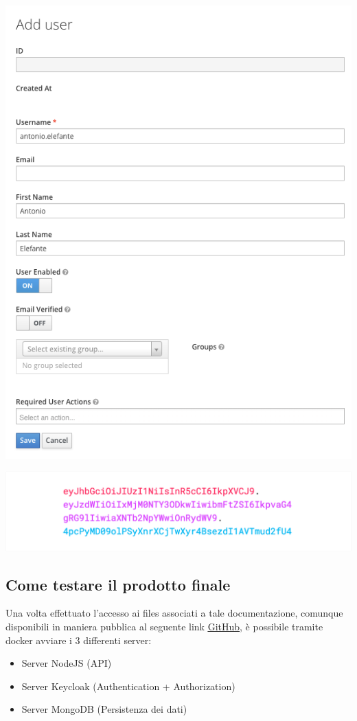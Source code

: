 \documentclass[twoside]{report}
\begin{document}
\begin{minipage}{\linewidth}
    \vspace{2mm}
    \centering
    \includegraphics[width= 0.5 \linewidth]{6.png}
    \vspace{2mm}
\end{minipage}

\begin{minipage}{\linewidth}
    \vspace{2mm}
    \centering
    \includegraphics[width= 0.5\linewidth]{1.png}
    \vspace{2mm}
\end{minipage}
\newpage
\subsection{Come testare il prodotto finale}

Una volta effettuato l'accesso ai files associati a tale documentazione, comunque disponibili in maniera pubblica al seguente link \href{https://github.com/antonioacademy10/progetto-soasec}{\underline{GitHub}}, è possibile tramite docker avviare i 3 differenti server:

\begin{itemize}
    \item Server NodeJS (API)
    \item Server Keycloak (Authentication + Authorization)
    \item Server MongoDB (Persistenza dei dati)
\end{itemize}
\end{document}
